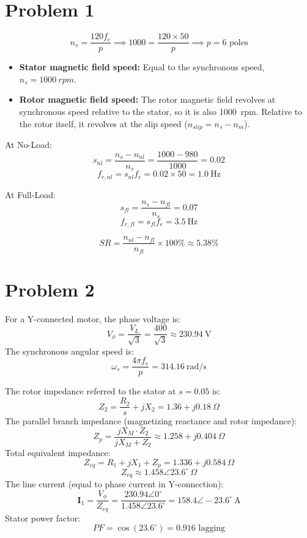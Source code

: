 \documentclass[12pt]{article}
\begin{document}
	
	\newpage
	\pagestyle{fancy}
	\fancyhf{}
	\cfoot{\thepage}


\newpage
\section{Problem 1}
$$ n_s = \frac{120 f_e}{p} \implies 1000 = \frac{120 \times 50}{p} \implies p = 6 \text{ poles} $$


\begin{itemize}
	\item \textbf{Stator magnetic field speed:} Equal to the synchronous speed, $n_s = \qty{1000}{rpm}$.
	\item \textbf{Rotor magnetic field speed:} The rotor magnetic field revolves at synchronous speed relative to the stator, so it is also \qty{1000}{rpm}. Relative to the rotor itself, it revolves at the slip speed ($n_{slip} = n_s - n_m$).
\end{itemize}


At No-Load:
$$ s_{nl} = \frac{n_s - n_{nl}}{n_s} = \frac{1000 - 980}{1000} = 0.02 $$
$$ f_{r,nl} = s_{nl} f_e = 0.02 \times 50 = \qty{1.0}{\Hz} $$

At Full-Load:
$$ s_{fl} = \frac{n_s - n_{fl}}{n_s} = 0.07 $$
$$ f_{r,fl} = s_{fl} f_e =\qty{3.5}{\Hz} $$


$$ SR = \frac{n_{nl} - n_{fl}}{n_{fl}} \times 100\% \approx 5.38\% $$

\newpage
\section{Problem 2}


For a Y-connected motor, the phase voltage is:
$$ V_\phi = \frac{V_L}{\sqrt{3}} = \frac{400}{\sqrt{3}} \approx \qty{230.94}{\V} $$
The synchronous angular speed is:
$$ \omega_s = \frac{4 \pi f_e}{p} = \qty{314.16}{\radian/\second} $$


The rotor impedance referred to the stator at $s = 0.05$ is:
$$ Z_2 = \frac{R_2}{s} + jX_2  = 1.36 + j0.18 \ \Omega $$
The parallel branch impedance (magnetizing reactance and rotor impedance):
$$ Z_p = \frac{jX_M \cdot Z_2}{jX_M + Z_2} \approx 1.258 + j0.404 \ \Omega $$
Total equivalent impedance:
$$ Z_{eq} = R_1 + jX_1 + Z_p = 1.336 + j0.584 \ \Omega $$
$$ Z_{eq} \approx 1.458 \angle 23.6^\circ \ \Omega $$
The line current (equal to phase current in Y-connection):
$$ \mathbf{I}_1 = \frac{V_\phi}{Z_{eq}} = \frac{230.94 \angle 0^\circ}{1.458 \angle 23.6^\circ} = 158.4 \angle -23.6^\circ \ \text{A} $$
Stator power factor:
$$ PF = \cos(23.6^\circ) = 0.916 \text{ lagging} $$
\end{document}
